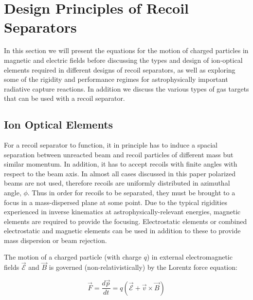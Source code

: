 \section{Design Principles of Recoil Separators}
\label{design}

In this section we will present the equations for the motion of charged particles in magnetic and electric fields before discussing the types and design of ion-optical elements required in different designs of recoil separators, as well as exploring some of the rigidity and performance regimes for astrophysically important radiative capture reactions. In addition we discuss the various types of gas targets that can be used with a recoil separator.

\subsection{Ion Optical Elements}
\label{ion}

For a recoil separator to function, it in principle has to induce a spacial separation between unreacted beam and recoil particles of different mass but similar momentum. In addition, it has to accept recoils with finite angles with respect to the beam axis. In almost all cases discussed in this paper polarized beams are not used, therefore recoils are uniformly distributed in azimuthal angle, $\phi$. 
Thus in order for recoils to be separated, they must be brought to a focus in a mass-dispersed plane at some point. Due to the typical rigidities experienced in inverse kinematics at astrophysically-relevant energies, magnetic elements are required to provide the focusing. Electrostatic elements or combined electrostatic and magnetic elements can be used in addition to these to provide mass dispersion or beam rejection.  

The motion of a charged particle (with charge $q$) in external electromagnetic fields $\vec{\mathcal{E}}$ and $\vec{B}$  is governed (non-relativistically) by the Lorentz force equation:

\begin{equation}
\vec{F}=\frac{d\vec{p}}{dt}=q(\vec{\mathcal{E}}+\vec{v}\times\vec{B})
\end{equation}   

